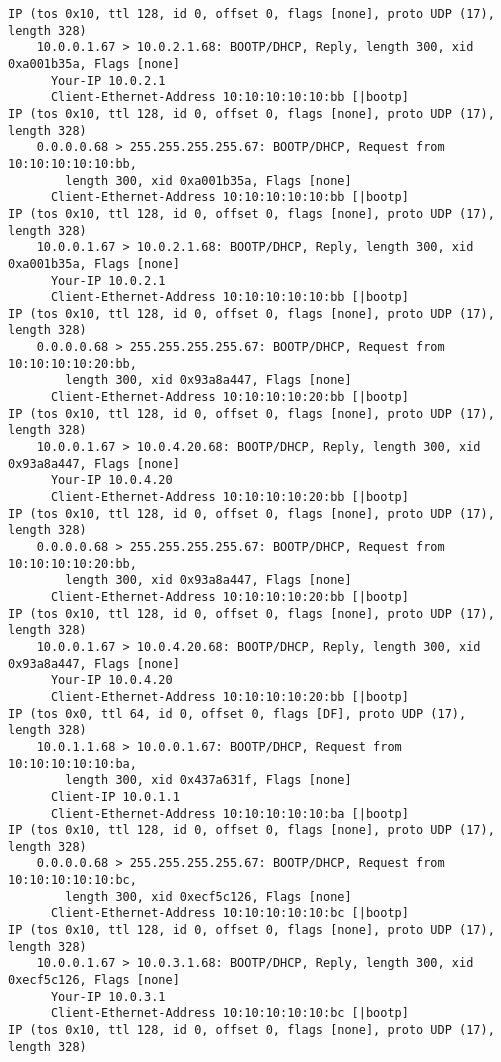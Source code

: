 \documentclass[a4paper,12pt]{article}
\begin{document}
\begin{Verbatim}
IP (tos 0x10, ttl 128, id 0, offset 0, flags [none], proto UDP (17), length 328) 
	10.0.0.1.67 > 10.0.2.1.68: BOOTP/DHCP, Reply, length 300, xid 0xa001b35a, Flags [none]
	  Your-IP 10.0.2.1
	  Client-Ethernet-Address 10:10:10:10:10:bb [|bootp]
IP (tos 0x10, ttl 128, id 0, offset 0, flags [none], proto UDP (17), length 328) 
	0.0.0.0.68 > 255.255.255.255.67: BOOTP/DHCP, Request from 10:10:10:10:10:bb, 
		length 300, xid 0xa001b35a, Flags [none]
	  Client-Ethernet-Address 10:10:10:10:10:bb [|bootp]
IP (tos 0x10, ttl 128, id 0, offset 0, flags [none], proto UDP (17), length 328) 
	10.0.0.1.67 > 10.0.2.1.68: BOOTP/DHCP, Reply, length 300, xid 0xa001b35a, Flags [none]
	  Your-IP 10.0.2.1
	  Client-Ethernet-Address 10:10:10:10:10:bb [|bootp]
IP (tos 0x10, ttl 128, id 0, offset 0, flags [none], proto UDP (17), length 328) 
	0.0.0.0.68 > 255.255.255.255.67: BOOTP/DHCP, Request from 10:10:10:10:20:bb, 
		length 300, xid 0x93a8a447, Flags [none]
	  Client-Ethernet-Address 10:10:10:10:20:bb [|bootp]
IP (tos 0x10, ttl 128, id 0, offset 0, flags [none], proto UDP (17), length 328) 
	10.0.0.1.67 > 10.0.4.20.68: BOOTP/DHCP, Reply, length 300, xid 0x93a8a447, Flags [none]
	  Your-IP 10.0.4.20
	  Client-Ethernet-Address 10:10:10:10:20:bb [|bootp]
IP (tos 0x10, ttl 128, id 0, offset 0, flags [none], proto UDP (17), length 328) 
	0.0.0.0.68 > 255.255.255.255.67: BOOTP/DHCP, Request from 10:10:10:10:20:bb, 
		length 300, xid 0x93a8a447, Flags [none]
	  Client-Ethernet-Address 10:10:10:10:20:bb [|bootp]
IP (tos 0x10, ttl 128, id 0, offset 0, flags [none], proto UDP (17), length 328) 
	10.0.0.1.67 > 10.0.4.20.68: BOOTP/DHCP, Reply, length 300, xid 0x93a8a447, Flags [none]
	  Your-IP 10.0.4.20
	  Client-Ethernet-Address 10:10:10:10:20:bb [|bootp]
IP (tos 0x0, ttl 64, id 0, offset 0, flags [DF], proto UDP (17), length 328) 
	10.0.1.1.68 > 10.0.0.1.67: BOOTP/DHCP, Request from 10:10:10:10:10:ba, 
		length 300, xid 0x437a631f, Flags [none]
	  Client-IP 10.0.1.1
	  Client-Ethernet-Address 10:10:10:10:10:ba [|bootp]
IP (tos 0x10, ttl 128, id 0, offset 0, flags [none], proto UDP (17), length 328) 
	0.0.0.0.68 > 255.255.255.255.67: BOOTP/DHCP, Request from 10:10:10:10:10:bc, 
		length 300, xid 0xecf5c126, Flags [none]
	  Client-Ethernet-Address 10:10:10:10:10:bc [|bootp]
IP (tos 0x10, ttl 128, id 0, offset 0, flags [none], proto UDP (17), length 328) 
	10.0.0.1.67 > 10.0.3.1.68: BOOTP/DHCP, Reply, length 300, xid 0xecf5c126, Flags [none]
	  Your-IP 10.0.3.1
	  Client-Ethernet-Address 10:10:10:10:10:bc [|bootp]
IP (tos 0x10, ttl 128, id 0, offset 0, flags [none], proto UDP (17), length 328) 

\end{Verbatim}
\end{document}
